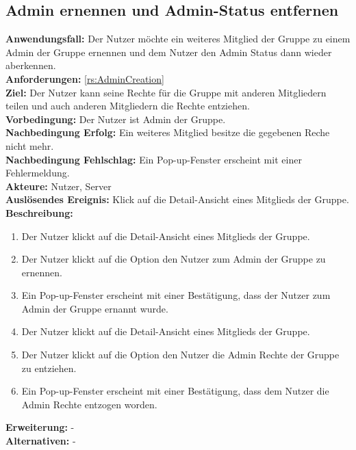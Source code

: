 \documentclass[parskip=full]{scrartcl}
\begin{document}
\subsection{Admin ernennen und Admin-Status entfernen}
\textbf{Anwendungsfall:} Der Nutzer möchte ein weiteres Mitglied der Gruppe zu einem Admin der Gruppe ernennen und dem Nutzer den Admin Status dann wieder aberkennen.\\
\textbf{Anforderungen:} \ref{rs:AdminCreation}\\
\textbf{Ziel:} Der Nutzer kann seine Rechte für die Gruppe mit anderen Mitgliedern teilen und auch anderen Mitgliedern die Rechte entziehen.\\
\textbf{Vorbedingung:} Der Nutzer ist Admin der Gruppe.\\
\textbf{Nachbedingung Erfolg:} Ein weiteres Mitglied besitze die gegebenen Reche nicht mehr.\\
\textbf{Nachbedingung Fehlschlag:} Ein Pop-up-Fenster erscheint mit einer Fehlermeldung.\\
\textbf{Akteure:} Nutzer, Server \\
\textbf{Auslösendes Ereignis:} Klick auf die Detail-Ansicht eines Mitglieds der Gruppe.\\
\textbf{Beschreibung:}
\begin{enumerate}
    \item Der Nutzer klickt auf die Detail-Ansicht eines Mitglieds der Gruppe.
    \item Der Nutzer klickt auf die Option den Nutzer zum Admin der Gruppe zu ernennen.
    \item Ein Pop-up-Fenster erscheint mit einer Bestätigung, dass der Nutzer zum Admin der Gruppe ernannt wurde.
    \item Der Nutzer klickt auf die Detail-Ansicht eines Mitglieds der Gruppe.
    \item Der Nutzer klickt auf die Option den Nutzer die Admin Rechte der Gruppe zu entziehen.
    \item Ein Pop-up-Fenster erscheint mit einer Bestätigung, dass dem Nutzer die Admin Rechte entzogen worden.
\end{enumerate}
\textbf{Erweiterung:} -\\
\textbf{Alternativen:} -
\newpage
\end{document}
